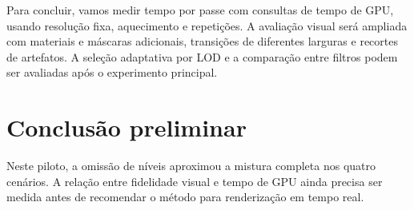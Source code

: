 \documentclass[11pt,a4paper]{article}
\begin{document}
Para concluir, vamos medir tempo por passe com consultas de tempo de GPU, usando resolução fixa, aquecimento e repetições. A avaliação visual será ampliada com materiais e máscaras adicionais, transições de diferentes larguras e recortes de artefatos. A seleção adaptativa por LOD e a comparação entre filtros podem ser avaliadas após o experimento principal.

\section{Conclusão preliminar}
Neste piloto, a omissão de níveis aproximou a mistura completa nos quatro cenários. A relação entre fidelidade visual e tempo de GPU ainda precisa ser medida antes de recomendar o método para renderização em tempo real.



\end{document}
